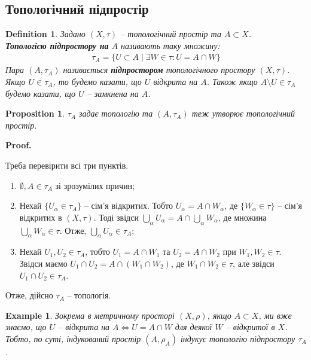 \documentclass[a4paper, 10pt]{article}
\makeatletter
\theoremstyle{theoremdd}
\newtheorem{definition}[theorem]{Definition}
\newtheorem{example}[theorem]{Example}
\newtheorem{proposition}[theorem]{Proposition}
\renewenvironment{proof}[1][Proof.\\]{\par
\pushQED{\hfill \qed}%
\normalfont \topsep6\p@\@plus6\p@\relax
\trivlist
\item\relax
{\bfseries
#1\@addpunct{.}}\hspace\labelsep\ignorespaces
}{%
\popQED\endtrivlist\@endpefalse
}
\makeatother
\begin{document}
\subsection{Топологічний підпростір}
\begin{definition}
Задано $(X,\tau)$ -- топологічний простір та $A \subset X$.\\
\textbf{Топологією підпростору на} $A$ називають таку множину:
\begin{align*}
\tau_A = \{ U \subset A \mid \exists W \in \tau: U = A \cap W\}
\end{align*}
Пара $(A,\tau_A)$ називається \textbf{підпростором} топологічного простору $(X,\tau)$.\\
Якщо $U \in \tau_A$, то будемо казати, що $U$ відкрита на $A$. Також якщо $A \setminus U \in \tau_A$ будемо казати, що $U$ -- замкнена на $A$.
\end{definition}

\begin{proposition}
$\tau_A$ задає топологію та $(A,\tau_A)$ теж утворює топологічний простір.
\end{proposition}

\begin{proof}
Треба перевірити всі три пунктів.
\begin{enumerate}[nosep,wide=0pt,label={\arabic*)}]
\item $\emptyset,A \in \tau_A$ зі зрозумілих причин;
\item Нехай $\{U_\alpha \in \tau_A\}$ -- сім'я відкритих. Тобто $U_\alpha = A \cap W_\alpha$, де $\{W_\alpha \in \tau\}$ -- сім'я відкритих в $(X,\tau)$. Тоді звідси $\displaystyle\bigcup_\alpha U_\alpha = A \cap \bigcup_\alpha W_\alpha$, де множина $\displaystyle\bigcup_\alpha W_\alpha \in \tau$. Отже, $\displaystyle\bigcup_\alpha U_\alpha \in \tau_A$;
\item Нехай $U_1, U_2 \in \tau_A$, тобто $U_1 = A \cap W_1$ та $U_2 = A \cap W_2$ при $W_1,W_2 \in \tau$. Звідси маємо $U_1 \cap U_2 = A \cap (W_1 \cap W_2)$, де $W_1 \cap W_2 \in \tau$, але звідси $U_1 \cap U_2 \in \tau_A$.
\end{enumerate}
Отже, дійсно $\tau_A$ -- топологія.
\end{proof}

\begin{example}
Зокрема в метричному просторі $(X,\rho)$, якщо $A \subset X$, ми вже знаємо, що $U$ -- відкрита на $A \iff U = A \cap W$ для деякої $W$ -- відкритої в $X$. Тобто, по суті, індукований простір $(A,\rho_A)$ індукує топологію підпростору $\tau_A$.
\end{example}
\end{document}
